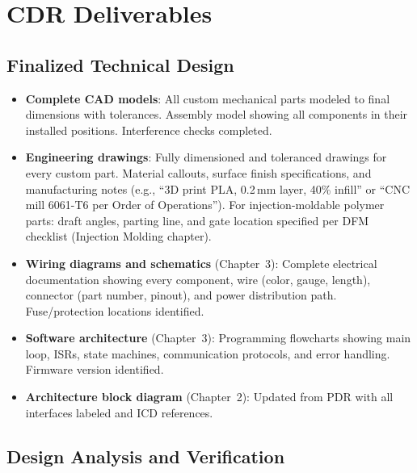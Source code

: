 \documentclass[11pt,letterpaper,twoside,openany]{book}
\begin{document}
\FloatBarrier
\section{CDR Deliverables}

\subsection{Finalized Technical Design}

\begin{itemize}[leftmargin=1.5em]
\item \textbf{Complete CAD models}: All custom mechanical parts modeled to final dimensions with tolerances. Assembly model showing all components in their installed positions. Interference checks completed.
\item \textbf{Engineering drawings}: Fully dimensioned and toleranced drawings for every custom part. Material callouts, surface finish specifications, and manufacturing notes (e.g., ``3D print PLA, 0.2\,mm layer, 40\% infill'' or ``CNC mill 6061-T6 per Order of Operations''). For injection-moldable polymer parts: draft angles, parting line, and gate location specified per DFM checklist (Injection Molding chapter).
\item \textbf{Wiring diagrams and schematics} (Chapter~3): Complete electrical documentation showing every component, wire (color, gauge, length), connector (part number, pinout), and power distribution path. Fuse/protection locations identified.
\item \textbf{Software architecture} (Chapter~3): Programming flowcharts showing main loop, ISRs, state machines, communication protocols, and error handling. Firmware version identified.
\item \textbf{Architecture block diagram} (Chapter~2): Updated from PDR with all interfaces labeled and ICD references.
\end{itemize}

\subsection{Design Analysis and Verification}
\end{document}
